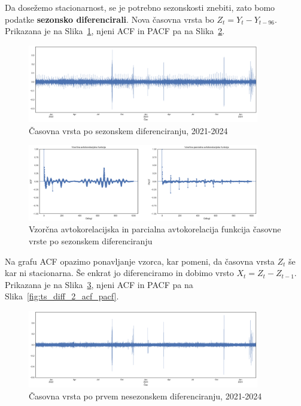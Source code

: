 \documentclass[a4paper, 11pt]{article}
\begin{document}
\noindent Da dosežemo stacionarnost, se je potrebno sezonskosti znebiti, zato bomo podatke \textbf{sezonsko diferencirali}.
Nova časovna vrsta bo $Z_t = Y_t - Y_{t-96}$. Prikazana je na Slika~\ref{fig:ts_diff}, njeni ACF in PACF pa na Slika~\ref{fig:ts_diff_acf_pacf}.

\begin{figure}[h!]
    \centering
    \caption{Časovna vrsta po sezonskem diferenciranju, 2021-2024}\par\medskip
    \label{fig:ts_diff}
    \includegraphics[width=0.9\textwidth]{ts_diff.png}
\end{figure}

\begin{figure}[h!]
    \centering
    \caption{Vzorčna avtokorelacijska in parcialna avtokorelacija funkcija časovne vrste po sezonskem diferenciranju}\par\medskip
    \label{fig:ts_diff_acf_pacf}
    \includegraphics[width=0.9\textwidth]{ts_diff_acf_pacf.png}
\end{figure}

\noindent Na grafu ACF opazimo ponavljanje vzorca, kar pomeni, da časovna vrsta $Z_t$ še kar ni stacionarna. 
Še enkrat jo diferenciramo in dobimo vrsto $X_t = Z_t - Z_{t-1}$. 
Prikazana je na Slika~\ref{fig:ts_diff_2}, njeni ACF in PACF pa na Slika~\ref{fig:ts_diff_2_acf_pacf}.

\begin{figure}[h!]
    \centering
    \caption{Časovna vrsta po prvem nesezonskem diferenciranju, 2021-2024}\par\medskip
    \label{fig:ts_diff_2}
    \includegraphics[width=0.9\textwidth]{ts_diff_2.png}
\end{figure}
\end{document}
